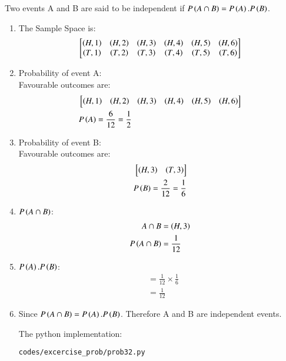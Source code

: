 \renewcommand{\theequation}{\theenumi}

\begin{theorem}
Two events A and B are said to be independent if $P\left(A \cap B\right) = P\left(A\right).P\left(B\right)$.
\end{theorem}


\begin{enumerate}

\item The Sample Space is:
\begin{align}
\begin{bmatrix}
\left(H, 1\right) & \left(H, 2\right) & \left(H, 3\right) & \left(H, 4\right) & \left(H, 5\right) & \left(H, 6\right) \\
\left(T, 1\right) & \left(T, 2\right) & \left(T, 3\right) & \left(T, 4\right) & \left(T, 5\right) & \left(T, 6\right)
\end{bmatrix}
\end{align}

\item Probability of event A:\\
Favourable outcomes are:
\begin{align}
&\begin{bmatrix}
\left(H, 1\right) & \left(H, 2\right) & \left(H, 3\right) & \left(H, 4\right) & \left(H, 5\right) & \left(H, 6\right) 
\end{bmatrix}\\
&P\left(A\right) = \frac{6}{12} = \frac{1}{2}
\end{align}

\item Probability of event B:\\
Favourable outcomes are:
\begin{align}
\begin{bmatrix}
\left(H, 3\right) & \left(T, 3\right)  
\end{bmatrix}\\
P\left(B\right) = \frac{2}{12} = \frac{1}{6}
\end{align}

\item $P\left(A \cap B\right)$:
\begin{align}
A \cap B &= \left(H, 3\right)\\   
P\left(A \cap B\right) &= \frac{1}{12} 
\end{align}

\item $P\left(A\right).P\left(B\right)$:
\begin{align}
&=\frac{1}{12} \times \frac{1}{6}\\
&= \frac{1}{12}
\end{align}

\item Since $P\left(A \cap B\right) = P\left(A\right).P\left(B\right)$. Therefore A and B are independent events.

The python implementation:
\begin{lstlisting}
codes/excercise_prob/prob32.py
\end{lstlisting}


\end{enumerate}
